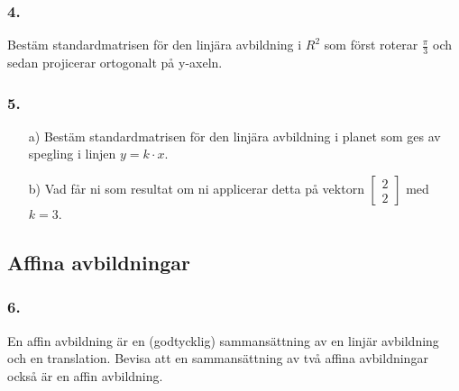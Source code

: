 \documentclass{article}
\begin{document}
\subsubsection*{4.}
Bestäm standardmatrisen för den linjära avbildning i $R^2$ som först roterar $\frac{\pi}{3}$ och sedan projicerar ortogonalt på y-axeln.

\subsubsection*{5.}
\begin{itemize}
	\item[a) ] Bestäm standardmatrisen för den linjära avbildning i planet som ges av spegling i linjen $y=k \cdot x$. 
	\item[b) ] Vad får ni som resultat om ni applicerar detta på vektorn $\begin{bmatrix}2 \\ 2\end{bmatrix}$ med $k=3$.
\end{itemize}

\subsection*{Affina avbildningar}
\subsubsection*{6.}
En affin avbildning är en (godtycklig) sammansättning av en linjär avbildning och en
translation. Bevisa att en sammansättning av två affina avbildningar också är en affin avbildning.
\end{document}
